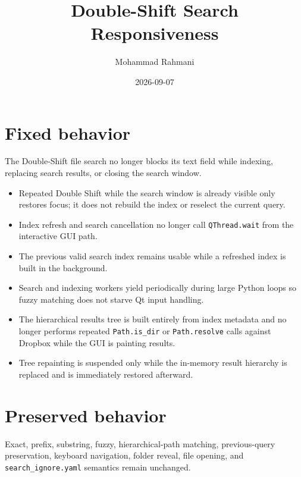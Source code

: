 \documentclass[a4paper]{article}
\title{Double-Shift Search Responsiveness}
\date{2026-09-07}
\author{Mohammad Rahmani}
\begin{document}
   \maketitle

   \section{Fixed behavior}

   The Double-Shift file search no longer blocks its text field while indexing,
   replacing search results, or closing the search window.

   \begin{itemize}
      \item Repeated Double Shift while the search window is already visible only
      restores focus; it does not rebuild the index or reselect the current query.
      \item Index refresh and search cancellation no longer call
      \verb|QThread.wait| from the interactive GUI path.
      \item The previous valid search index remains usable while a refreshed index
      is built in the background.
      \item Search and indexing workers yield periodically during large Python loops
      so fuzzy matching does not starve Qt input handling.
      \item The hierarchical results tree is built entirely from index metadata and
      no longer performs repeated \verb|Path.is_dir| or \verb|Path.resolve| calls
      against Dropbox while the GUI is painting results.
      \item Tree repainting is suspended only while the in-memory result hierarchy is
      replaced and is immediately restored afterward.
   \end{itemize}

   \section{Preserved behavior}

   Exact, prefix, substring, fuzzy, hierarchical-path matching, previous-query
   preservation, keyboard navigation, folder reveal, file opening, and
   \verb|search_ignore.yaml| semantics remain unchanged.

   
   
\end{document}
